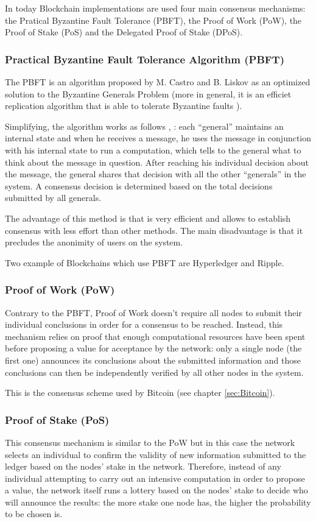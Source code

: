 In today Blockchain implementations are used four main consensus mechanisms:
the Pratical Byzantine Fault Tolerance (PBFT), the Proof of Work (PoW),
the Proof of Stake (PoS) and the Delegated Proof of Stake (DPoS).

\subsubsection{Practical Byzantine Fault Tolerance Algorithm (PBFT)}
The PBFT is an algorithm proposed by M. Castro and B. Liskov as an optimized solution
to the Byzantine Generals Problem (more in general, it is an efficiet replication
algorithm that is able to tolerate Byzantine faults \cite{castro1999practical}).

Simplifying, the algorithm works as follows \cite{blockchain-consensus-medium},
\cite{castro1999practical}: each ``general'' maintains an
internal state and when he receives a message, he uses the message in
conjunction with his internal state to run a computation, which tells to the
general what to think about the message in question.
After reaching his individual decision about the message, the general shares that
decision with all the other ``generals'' in the system.
A consensus decision is determined based on the total decisions submitted by all
generals.


The advantage of this method is that is very efficient and allows to establish
consensus with less effort than other methods. The main disadvantage is that it
precludes the anonimity of users on the system.

Two example of Blockchains which use PBFT are Hyperledger and Ripple.

\subsubsection{Proof of Work (PoW)}
Contrary to the PBFT, Proof of Work doesn't require all nodes to submit their
individual conclusions in order for a consensus to be reached. Instead, this
mechanism relies on proof that enough computational resources have been spent
before proposing a value for acceptance by the network: only a single node (the first one)
announces its conclusions about the submitted information and those conclusions
can then be independently verified by all other nodes in the system.

This is the consensus scheme used by Bitcoin (see chapter \ref{sec:Bitcoin}).

\subsubsection{Proof of Stake (PoS)}\label{sec:proof-of-stake}
This consensus mechanism is similar to the PoW but in this case the network
selects an individual to confirm the validity of new information submitted to
the ledger based on the nodes' stake in the network. Therefore, instead of any
individual attempting to carry out an intensive computation in order to propose
a value, the network itself runs a lottery based on the nodes' stake to decide
who will announce the results: the more stake one node has, the higher the probability
to be chosen is.

